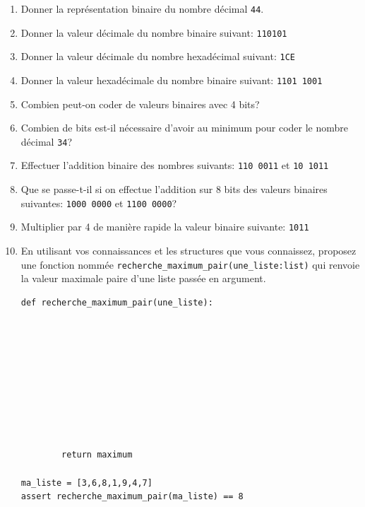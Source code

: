 \documentclass[a4paper,12pt,openany]{book}
\begin{document}
\begin{enumerate}
	\item Donner la représentation binaire du nombre décimal \verb+44+. 
	
	\vspace{3cm}
	
	\item Donner la valeur décimale du nombre binaire suivant: \verb+110101+
	
	\vspace{3cm}
	
	\item Donner la valeur décimale du nombre hexadécimal suivant: \verb+1CE+
	
	\vspace{3cm}
	
	\item Donner la valeur hexadécimale du nombre binaire suivant: \verb+1101 1001+
	
	
	\vspace{3cm}
	
	
	\item Combien peut-on coder de valeurs binaires avec 4 bits? \dotfill
	
	\bigskip
	
	\item Combien de bits est-il nécessaire d'avoir au minimum pour coder le nombre décimal \verb+34+? \dotfill
	
	
	\bigskip
	
	\item Effectuer l'addition binaire des nombres suivants: \verb+110 0011+ et \verb+10 1011+
	
	\vspace{3cm}
	
	\item Que se passe-t-il si on effectue l'addition sur 8 bits des valeurs binaires suivantes: \verb+1000 0000+ et \verb+1100 0000+?
	
	\vspace{3cm}
	
	\item Multiplier par 4 de manière rapide la valeur binaire suivante: \verb+1011+ \dotfill
	
	\vspace{3cm}
	
	
	\item En utilisant vos connaissances et les structures que vous connaissez, proposez une fonction nommée \verb+recherche_maximum_pair(une_liste:list)+ qui renvoie la valeur maximale paire d'une liste passée en argument.
	
\begin{lstlisting}[numbers=none]
def recherche_maximum_pair(une_liste):
		









		return maximum
		
ma_liste = [3,6,8,1,9,4,7]
assert recherche_maximum_pair(ma_liste) == 8
\end{lstlisting}	
\end{enumerate}
\end{document}
